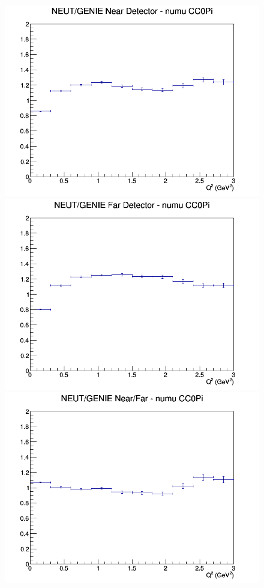 \begin{figure}[h]
\endminipage
\newline
{}
\includegraphics[width=\linewidth]{eff_Q2/FGT/ratios/CC0Pi_NEUT_GENIE_numu_near_Q2.png}
\endminipage
{}
\includegraphics[width=\linewidth]{eff_Q2/FGT/ratios/CC0Pi_NEUT_GENIE_numu_far_Q2.png}
\endminipage
{}
\includegraphics[width=\linewidth]{eff_Q2/FGT/ratios/CC0Pi_NEUT_GENIE_numu_NF_Q2.png}

\end{figure}
